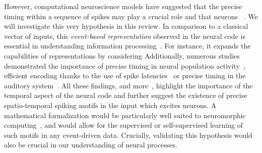 \documentclass[brainsci, %
               review,submit,pdftex,moreauthors
               ]{Definitions/mdpi}
\begin{document}
However, computational neuroscience models have suggested that the precise timing within a sequence of spikes may play a crucial role and that neurons ~\citep{abeles_role_1982}. We will investigate this very hypothesis in this review. %
In comparison to a classical  vector of inputs, this \emph{event-based representation} observed in the neural code is essential in understanding information processing~\citep{carr_processing_1993}. For instance, it expands the capabilities of representations  by considering   Additionally, numerous studies demonstrated the importance of precise timing in neural population activity~\citep{davis_spontaneous_2021}, efficient encoding thanks to the use of spike latencies~\citep{perrinet_coding_2004,gollisch_rapid_2008} or precise timing in the auditory system~\citep{deweese_binary_2003,carr_circuit_1990}. All these findings, and more~\citep{bohte_evidence_2004,dilorenzo_spike_2013}, highlight the importance of the temporal aspect of the neural code and further suggest the existence of precise spatio-temporal spiking motifs in the input which excites neurons.  A mathematical formalization would be particularly well suited to neuromorphic computing~\citep{roy_towards_2019}, and would allow for the supervised or self-supervised learning of such motifs in any event-driven data.  Crucially, validating this hypothesis would also be crucial in our understanding of neural processes. %
%
\end{document}
